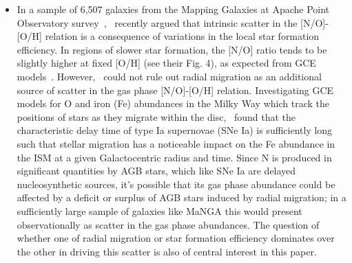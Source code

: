 \documentclass[ms.tex]{subfiles}
\begin{document}
\begin{itemize}
	\item In a sample of 6,507 galaxies from the Mapping Galaxies at Apache 
	Point Observatory survey~\citep[MaNGA;][]{Bundy2015},~\citet{Schaefer2020} 
	recently argued that intrinsic scatter in the [N/O]-[O/H] relation is a 
	consequence of variations in the local star formation efficiency. 
	In regions of slower star formation, the [N/O] ratio tends to be slightly 
	higher at fixed [O/H] (see their Fig. 4), as expected from GCE 
	models~\citep[e.g.][]{Molla2006, Vincenzo2016a}. 
	However,~\citet{Schaefer2020} could not rule out radial migration as an 
	additional source of scatter in the gas phase [N/O]-[O/H] relation. 
	Investigating GCE models for O and iron (Fe) abundances in the Milky Way 
	which track the positions of stars as they migrate within the 
	disc,~\citet{Johnson2021} found that the characteristic delay time of type 
	Ia supernovae (SNe Ia) is sufficiently long such that stellar migration 
	has a noticeable impact on the Fe abundance in the ISM at a given 
	Galactocentric radius and time. 
	Since N is produced in significant quantities by AGB stars, which like SNe 
	Ia are delayed nucleosynthetic sources, it's possible that its gas phase 
	abundance could be affected by a deficit or surplus of AGB stars induced 
	by radial migration; in a sufficiently large sample of galaxies like MaNGA 
	this would present observationally as scatter in the gas phase abundances. 
	The question of whether one of radial migration or star formation 
	efficiency dominates over the other in driving this scatter is also of 
	central interest in this paper. 
\end{itemize} 
\end{document}
